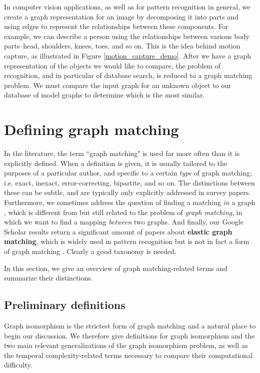 \documentclass[12pt]{thesis}
\theoremstyle{plain}
\theoremstyle{definition}
\theoremstyle{remark}
\begin{document}
In computer vision applications, as well as for pattern recognition in general, we create a graph representation for an image by decomposing it into parts and using edges to represent the relationships between these components. For example, we can describe a person using the relationships between various body parts--head, shoulders, knees, toes, and so on. This is the idea behind motion capture, as illustrated in Figure \ref{motion_capture_demo}. After we have a graph representation of the objects we would like to compare, the problem of recognition, and in particular of database search, is reduced to a graph matching problem. We must compare the input graph for an unknown object to our database of model graphs to determine which is the most similar.

\section{Defining graph matching}\label{section:defining_graph_matching}

In the literature, the term ``graph matching" is used far more often than it is explicitly defined. When a definition is given, it is usually tailored to the purposes of a particular author, and specific to a certain \textit{type} of graph matching; i.e. exact, inexact, error-correcting, bipartite, and so on. The distinctions between these can be subtle, and are typically only explicitly addressed in survey papers. Furthermore, we sometimes address the question of finding a matching \textit{in} a graph \cite{wikiMatchingInAGraph}, which is different from but still related to the problem of \textit{graph matching}, in which we want to find a mapping \textit{between} two graphs. And finally, our Google Scholar results return a significant amount of papers about \textbf{elastic graph matching}, which is widely used in pattern recognition but is not in fact a form of graph matching \cite{Conte_2003}. Clearly a good taxonomy is needed.

In this section, we give an overview of graph matching-related terms and summarize their distinctions.

\subsection{Preliminary definitions}

Graph isomorphism is the strictest form of graph matching and a natural place to begin our discussion. We therefore give definitions for graph isomorphism and the two main relevant generalizations of the graph isomorphism problem, as well as the temporal complexity-related terms necessary to compare their computational difficulty.
\end{document}
